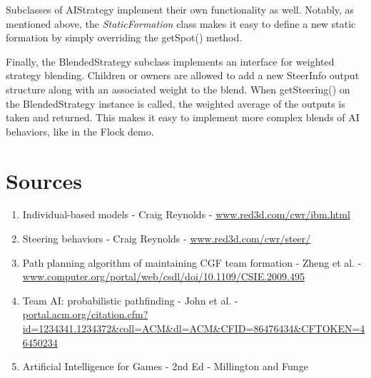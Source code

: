 \documentclass{article}
\begin{document}
Subclasses of AIStrategy implement their own functionality as well. Notably,
as mentioned above, the \emph{StaticFormation} class makes it easy to define
a new static formation by simply overriding the getSpot() method.

Finally, the BlendedStrategy subclass implements an interface for weighted
strategy blending. Children or owners are allowed to add a new SteerInfo output
structure along with an associated weight to the blend. When getSteering() on
the BlendedStrategy instance is called, the weighted average of the outputs
is taken and returned. This makes it easy to implement more complex blends
of AI behaviors, like in the Flock demo.


\section {Sources}
\begin{enumerate}
\item Individual-based models - Craig Reynolds - \url{www.red3d.com/cwr/ibm.html}
\item Steering behaviors - Craig Reynolds - \url{www.red3d.com/cwr/steer/}
\item Path planning algorithm of maintaining CGF team formation - Zheng et al. - \url{www.computer.org/portal/web/csdl/doi/10.1109/CSIE.2009.495}
\item Team AI: probabilistic pathfinding - John et al. - \url{portal.acm.org/citation.cfm?id=1234341.1234372&coll=ACM&dl=ACM&CFID=86476434&CFTOKEN=46450234}
\item Artificial Intelligence for Games - 2nd Ed - Millington and Funge
\end{enumerate}
\end{document}
